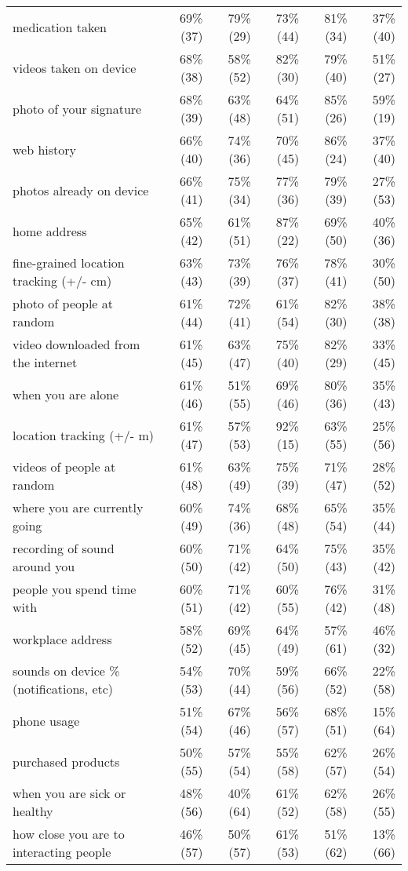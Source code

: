 \begin{table*}[t]
\begin{center}
\begin{tabular}{| l | r | r | r | r | r |}
medication taken & 69\% (37) & 79\% (29) & 73\% (44) & 81\% (34) & 37\% (40) \\ 
videos taken on device & 68\% (38) & 58\% (52) & 82\% (30) & 79\% (40) & 51\% (27) \\ 
photo of your signature & 68\% (39) & 63\% (48) & 64\% (51) & 85\% (26) & 59\% (19) \\ 
web history & 66\% (40) & 74\% (36) & 70\% (45) & 86\% (24) & 37\% (40) \\ 
photos already on device & 66\% (41) & 75\% (34) & 77\% (36) & 79\% (39) & 27\% (53) \\ 
home address & 65\% (42) & 61\% (51) & 87\% (22) & 69\% (50) & 40\% (36) \\ 
fine-grained location tracking (+/-  cm) & 63\% (43) & 73\% (39) & 76\% (37) & 78\% (41) & 30\% (50) \\ 
photo of people at random & 61\% (44) & 72\% (41) & 61\% (54) & 82\% (30) & 38\% (38) \\ 
video downloaded from the internet & 61\% (45) & 63\% (47) & 75\% (40) & 82\% (29) & 33\% (45) \\ 
when you are alone & 61\% (46) & 51\% (55) & 69\% (46) & 80\% (36) & 35\% (43) \\ 
location tracking (+/- m) & 61\% (47) & 57\% (53) & 92\% (15) & 63\% (55) & 25\% (56) \\ 
videos of people at random & 61\% (48) & 63\% (49) & 75\% (39) & 71\% (47) & 28\% (52) \\ 
where you are currently going & 60\% (49) & 74\% (36) & 68\% (48) & 65\% (54) & 35\% (44) \\ 
recording of sound around you & 60\% (50) & 71\% (42) & 64\% (50) & 75\% (43) & 35\% (42) \\ 
people you spend time with & 60\% (51) & 71\% (42) & 60\% (55) & 76\% (42) & 31\% (48) \\ 
workplace address & 58\% (52) & 69\% (45) & 64\% (49) & 57\% (61) & 46\% (32) \\ 
sounds on device \% (notifications, etc) & 54\% (53) & 70\% (44) & 59\% (56) & 66\% (52) & 22\% (58) \\ 
phone usage & 51\% (54) & 67\% (46) & 56\% (57) & 68\% (51) & 15\% (64) \\ 
purchased products & 50\% (55) & 57\% (54) & 55\% (58) & 62\% (57) & 26\% (54) \\ 
when you are sick or healthy & 48\% (56) & 40\% (64) & 61\% (52) & 62\% (58) & 26\% (55) \\ 
how close you are to interacting people & 46\% (57) & 50\% (57) & 61\% (53) & 51\% (62) & 13\% (66) \\ 

\end{tabular}
\end{center}
\end{table*}
